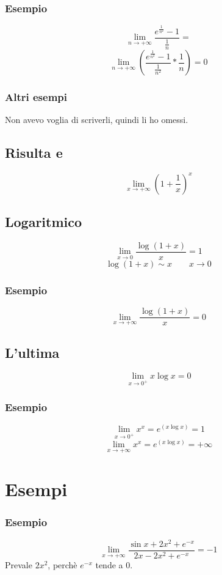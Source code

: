 \documentclass{article}
\begin{document}
\subsubsection{Esempio}
\[\lim_{n \to +\infty} \frac{e^{\frac{1}{n^2}} - 1}{\frac{1}{n}} =\]
\[\lim_{n \to +\infty} (\frac{e^{\frac{1}{n^2}} - 1}{\frac{1}{n^2}} * \frac{1}{n}) = 0\]

\subsubsection{Altri esempi}
Non avevo voglia di scriverli, quindi li ho omessi.

\subsection{Risulta e}
\[\lim_{x \to +\infty} (1 + \frac{1}{x})^x\]

\subsection{Logaritmico}
\[\lim_{x \to 0} \frac{\log(1+x)}{x} = 1\]
\[\log(1+x) \sim x \qquad x \to 0\]

\subsubsection{Esempio}
\[\lim_{x \to +\infty} \frac{\log(1+x)}{x} = 0\]

\subsection{L'ultima}
\[\lim_{x \to 0^+} x \log x = 0\]

\subsubsection{Esempio}
\[\lim_{x \to 0^+} x^x = e^(x \log x) = 1\]
\[\lim_{x \to +\infty} x^x = e^(x \log x) = +\infty\]

\section{Esempi}
\subsubsection{Esempio}
\[\lim_{x \to +\infty} \frac{\sin x + 2x^2 + e^{-x}}{2x - 2x^2 + e^{-x}} = -1\]
Prevale \(2x^2\), perchè \(e^{-x}\) tende a 0.
\end{document}

